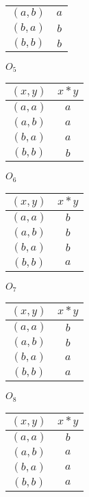 \documentclass[12pt]{article}
\begin{document}
\begin{flushleft}
\begin{enumerate}
\begin{minipage}[h]{.2\textwidth}
\begin{tabular}{ c | c }
        	$(a,b)$ & $a$ \\
        	$(b,a)$ & $b$ \\
        	$(b,b)$ & $b$
      	\end{tabular}
    	\end{minipage} 
      \begin{minipage}[h]{.2\textwidth}
				$O_5$
    		\begin{tabular}{ c | c }
      		$(x,y)$ & $x*y$ \\
        	\hline
        	$(a,a)$ & $a$ \\
        	$(a,b)$ & $a$ \\
        	$(b,a)$ & $a$ \\
        	$(b,b)$ & $b$
      	\end{tabular}
    	\end{minipage}
    	\bigskip
      \begin{minipage}[h]{.2\textwidth}
				$O_6$
    		\begin{tabular}{ c | c }
      		$(x,y)$ & $x*y$ \\
        	\hline
        	$(a,a)$ & $b$ \\
        	$(a,b)$ & $b$ \\
        	$(b,a)$ & $b$ \\
        	$(b,b)$ & $a$
      	\end{tabular}
    	\end{minipage} 	
    	\begin{minipage}[h]{.2\textwidth}
				$O_7$
    		\begin{tabular}{ c | c }
      		$(x,y)$ & $x*y$ \\
        	\hline
        	$(a,a)$ & $b$ \\
        	$(a,b)$ & $b$ \\
        	$(b,a)$ & $a$ \\
        	$(b,b)$ & $a$
      	\end{tabular}
    	\end{minipage}
    	\begin{minipage}[h]{.2\textwidth}
				$O_8$
    		\begin{tabular}{ c | c }
      		$(x,y)$ & $x*y$ \\
        	\hline
        	$(a,a)$ & $b$ \\
        	$(a,b)$ & $a$ \\
        	$(b,a)$ & $a$ \\
        	$(b,b)$ & $a$
      	\end{tabular}
    	\end{minipage}

\end{enumerate}
\end{flushleft}
\end{document}

